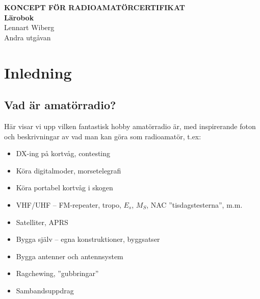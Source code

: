 \documentclass[a4paper,twoside,openright]{book}
\begin{document}
\AddToShipoutPicture*{\Backgroundtwo}

\pagestyle{empty}



\onecolumn
\vspace{3cm}
\begin{center}
\Huge{\bfseries{\color{white}KONCEPT FÖR RADIO\-AMATÖRCERTIFIKAT}} \\[2ex]
\Huge{\bfseries{\color{white}Lärobok}} \\[2ex]
\huge{\color{white}Lennart Wiberg} \\
\Large{\color{white}Andra utgåvan}
\end{center}

\clearpage




\lfoot[\revision]{}
\rfoot[]{\revision}

\cleardoublepage
\pagestyle{fancy}


\tableofcontents

\setlength{\parindent}{0pt}
\setlength{\parskip}{1ex plus 0.5ex minus 0.2ex}

\mainmatter

%





\part{Inledning}

\chapter{Vad är amatörradio?}
Här visar vi upp vilken fantastisk hobby amatörradio är, med
inspirerande foton och beskrivningar av vad man kan göra som
radioamatör, t.ex:
\begin{itemize}
\item DX-ing på kortvåg, contesting
\item Köra digitalmoder, morsetelegrafi
\item Köra portabel kortvåg i skogen
\item VHF/UHF -- FM-repeater, tropo, $E_s$, $M_S$, NAC ''tisdagstesterna'', m.m.
\item Satelliter, APRS
\item Bygga själv -- egna konstruktioner, byggsatser
\item Bygga antenner och antennsystem
\item Ragchewing, ''gubbringar''
\item Sambandsuppdrag
\end{itemize}
\end{document}
